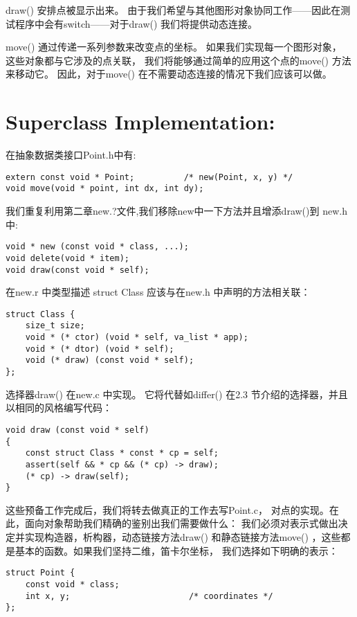 draw() 安排点被显示出来。
由于我们希望与其他图形对象协同工作——因此在测试程序中会有switch——对于draw() 
我们将提供动态连接。


move() 通过传递一系列参数来改变点的坐标。
如果我们实现每一个图形对象，
这些对象都与它涉及的点关联，
我们将能够通过简单的应用这个点的move() 方法来移动它。
因此，对于move() 在不需要动态连接的情况下我们应该可以做。

\section{Superclass Implementation:}
在抽象数据类接口Point.h中有:

\begin{lstlisting}
extern const void * Point;			/* new(Point, x, y) */
void move(void * point, int dx, int dy);
\end{lstlisting}

我们重复利用第二章new.?文件,我们移除new中一下方法并且增添draw()到 new.h中:
\begin{lstlisting}
void * new (const void * class, ...);
void delete(void * item);
void draw(const void * self);
\end{lstlisting}

在new.r 中类型描述 struct Class 应该与在new.h 中声明的方法相关联：
\begin{lstlisting}
struct Class {
    size_t size;
    void * (* ctor) (void * self, va_list * app);
    void * (* dtor) (void * self);
    void (* draw) (const void * self);
};
\end{lstlisting}

选择器draw() 在new.c 中实现。
它将代替如differ() 在2.3 节介绍的选择器，并且以相同的风格编写代码：
\begin{lstlisting}
void draw (const void * self)
{
    const struct Class * const * cp = self;
    assert(self && * cp && (* cp) -> draw);
    (* cp) -> draw(self);
}
\end{lstlisting}

这些预备工作完成后，我们将转去做真正的工作去写Point.c，
对点的实现。在此，面向对象帮助我们精确的鉴别出我们需要做什么：
我们必须对表示式做出决定并实现构造器，析构器，动态链接方法draw() 
和静态链接方法move() ，这些都是基本的函数。如果我们坚持二维，笛卡尔坐标，
我们选择如下明确的表示：
\begin{lstlisting}
struct Point {
    const void * class;
    int x, y;                        /* coordinates */
};
\end{lstlisting}

